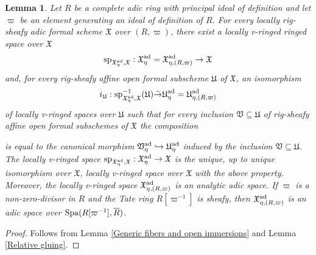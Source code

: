 \documentclass[12pt,twoside,a4paper]{article}
\newtheorem{lemma}[thm]{Lemma}
\theoremstyle{definition}
\theoremstyle{remark}
\newcommand\ad{{\rm ad}}
\newcommand\spc{{\rm sp}}
\newcommand\Spa{{\rm Spa}}
\begin{document}
\begin{lemma}\label{Generic fiber via gluing}Let $R$ be a complete adic ring with principal ideal of definition and let $\varpi$ be an element generating an ideal of definition of $R$. For every locally rig-sheafy adic formal scheme $\mathfrak{X}$ over $(R, \varpi)$, there exist a locally v-ringed ringed space over $\mathfrak{X}$ \begin{equation*}\spc_{\mathfrak{X}_{\eta}^{\ad},\mathfrak{X}}: \mathfrak{X}_{\eta}^{\ad}=\mathfrak{X}_{\eta, (R, \varpi)}^{\ad}\to \mathfrak{X}\end{equation*}and, for every rig-sheafy affine open formal subscheme $\mathfrak{U}$ of $\mathfrak{X}$, an isomorphism \begin{equation*}i_{\mathfrak{U}}: \spc_{\mathfrak{X}_{\eta}^{\ad},\mathfrak{X}}^{-1}(\mathfrak{U})\tilde{\to}\mathfrak{U}_{\eta}^{\ad}=\mathfrak{U}_{\eta, (R, \varpi)}^{\ad}\end{equation*}of locally v-ringed spaces over $\mathfrak{U}$ such that for every inclusion $\mathfrak{V}\subseteq \mathfrak{U}$ of rig-sheafy affine open formal subschemes of $\mathfrak{X}$ the composition \begin{center}\end{center}is equal to the canonical morphism $\mathfrak{V}_{\eta}^{\ad}\hookrightarrow \mathfrak{U}_{\eta}^{\ad}$ induced by the inclusion $\mathfrak{V}\subseteq \mathfrak{U}$. The locally v-ringed space $\spc_{\mathfrak{X}_{\eta}^{\ad},\mathfrak{X}}: \mathfrak{X}_{\eta}^{\ad}\to \mathfrak{X}$ is the unique, up to unique isomorphism over $\mathfrak{X}$, locally v-ringed space over $\mathfrak{X}$ with the above property. Moreover, the locally v-ringed space $\mathfrak{X}_{\eta, (R, \varpi)}^{\ad}$ is an analytic adic space. If $\varpi$ is a non-zero-divisor in $R$ and the Tate ring $R[\varpi^{-1}]$ is sheafy, then $\mathfrak{X}_{\eta, (R, \varpi)}^{\ad}$ is an adic space over $\Spa(R[\varpi^{-1}], \overline{R})$.\end{lemma}
\begin{proof}Follows from Lemma \ref{Generic fibers and open immersions} and Lemma \ref{Relative gluing}.\end{proof}
\end{document}
